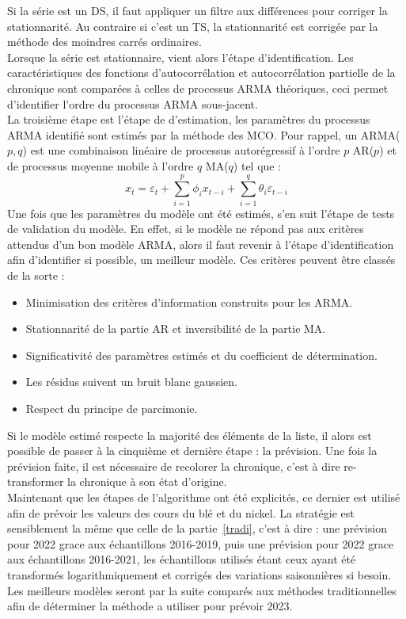 Si la série est un DS, il faut appliquer un filtre aux différences pour corriger la stationnarité. Au contraire si c'est un TS, la stationnarité est corrigée par la 
méthode des moindres carrés ordinaires.\\[11pt]
Lorsque la série est stationnaire, vient alors l'étape d'identification. Les caractéristiques des fonctions d'autocorrélation et autocorrélation partielle de la chronique
sont comparées à celles de processus ARMA théoriques, ceci permet d'identifier l'ordre du processus ARMA sous-jacent.\\[11pt]
La troisième étape est l'étape de d'estimation, les paramètres du processus ARMA identifié sont estimés par la méthode des MCO. Pour rappel, un ARMA($p,q$) est une 
combinaison linéaire de processus autorégressif à l'ordre $p$ AR($p$) et de processus moyenne mobile à l'ordre $q$ MA($q$) tel que :
\begin{equation*}
    x_t = \varepsilon_t +  \sum_{i=1}^p \phi_i x_{t-i} + \sum_{i=1}^q \theta_i \varepsilon_{t-i}
\end{equation*}
Une fois que les paramètres du modèle ont été estimés, s'en suit l'étape de tests de validation du modèle. En effet, si le modèle ne répond pas aux critères attendus 
d'un bon modèle ARMA, alors il faut revenir à l'étape d'identification afin d'identifier si possible, un meilleur modèle. Ces critères peuvent être classés de la sorte :
\begin{itemize}
    \item Minimisation des critères d'information construits pour les ARMA.
    \item Stationnarité de la partie AR et inversibilité de la partie MA.
    \item Significativité des paramètres estimés et du coefficient de détermination.
    \item Les résidus suivent un bruit blanc gaussien.
    \item Respect du principe de parcimonie.
\end{itemize}
Si le modèle estimé respecte la majorité des éléments de la liste, il alors est possible de passer à la cinquième et dernière étape : la prévision. Une fois la prévision
faite, il est nécessaire de recolorer la chronique, c'est à dire re-transformer la chronique à son état d'origine.\\[11pt]
Maintenant que les étapes de l'algorithme ont été explicités, ce dernier est utilisé afin de prévoir les valeurs des cours du blé et du nickel. La stratégie est 
sensiblement la même que celle de la partie~\ref{tradi}, c'est à dire : une prévision pour 2022 grace aux échantillons 2016-2019, puis une prévision pour 2022 grace aux 
échantillons 2016-2021, les échantillons utilisés étant ceux ayant été transformés logarithmiquement et corrigés des variations saisonnières si besoin. Les meilleurs 
modèles seront par la suite comparés aux méthodes traditionnelles afin de déterminer la méthode a utiliser pour prévoir 2023.
